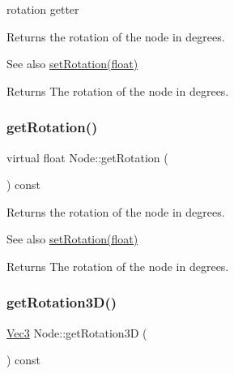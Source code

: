 rotation getter 

Returns the rotation of the node in degrees.

\begin{DoxySeeAlso}{See also}
{\ttfamily \hyperlink{classNode_a62dda439f77712f0d9b405ce887df676}{set\+Rotation(float)}}
\end{DoxySeeAlso}
\begin{DoxyReturn}{Returns}
The rotation of the node in degrees. 
\end{DoxyReturn}
\mbox{\label{classNode_a2bd3900c64525f5b76b0ba7cd489f440}} 
\subsubsection{\texorpdfstring{get\+Rotation()}{getRotation()}\hspace{0.1cm}{\footnotesize\ttfamily [2/2]}}
{\footnotesize\ttfamily virtual float Node\+::get\+Rotation (\begin{DoxyParamCaption}{ }\end{DoxyParamCaption}) const\hspace{0.3cm}{\ttfamily [virtual]}}

Returns the rotation of the node in degrees.

\begin{DoxySeeAlso}{See also}
{\ttfamily \hyperlink{classNode_a62dda439f77712f0d9b405ce887df676}{set\+Rotation(float)}}
\end{DoxySeeAlso}
\begin{DoxyReturn}{Returns}
The rotation of the node in degrees. 
\end{DoxyReturn}
\mbox{\label{classNode_aeabcf9427f303b0adf32bb7513706e2c}} 
\subsubsection{\texorpdfstring{get\+Rotation3\+D()}{getRotation3D()}\hspace{0.1cm}{\footnotesize\ttfamily [1/2]}}
{\footnotesize\ttfamily \hyperlink{classVec3}{Vec3} Node\+::get\+Rotation3D (\begin{DoxyParamCaption}{ }\end{DoxyParamCaption}) const\hspace{0.3cm}{\ttfamily [virtual]}}

